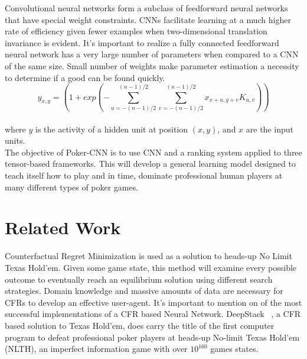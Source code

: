 \documentclass[review]{elsarticle}
\begin{document}
Convolutional neural networks form a subclass of feedforward 
neural networks that have special weight constraints. CNNs facilitate 
learning  at a much higher rate of efficiency given fewer examples when 
two-dimensional translation invariance is evident. 
It's important to realize a fully connected feedforward neural network 
has a very large number of parameters when compared to a CNN of the same size. 
Small number of weights make parameter estimation a necessity to determine 
if a good can be found quickly. ~\cite{ISutskeve2008} \\


\begin{equation*}
y_{x,y} = \left(1 + exp \left(  -\sum_{u=-(n-1)/2}^{(n-1)/2}
            \sum_{v=-(n-1)/2}^{(n-1)/2} x_{x+u,y+v} K_{u,v} \right) \right)
\end{equation*}\\

where $y$ is the activity of a hidden unit at position $(x,y)$, and $x$ 
are the input units.~\cite{ISutskeve2008} \\

The objective of Poker-CNN is to use CNN and a ranking system applied to three 
tensor-based frameworks. This will develop a general learning model designed to 
teach itself how to play and in time, dominate professional human players at 
many different types of poker games. \\


\section{Related Work}
Counterfactual Regret Minimization is used as a solution to heads-up
No Limit Texas Hold'em. Given some game state, 
this method will examine every possible outcome to eventually reach 
an equilibrium solution using different search strategies. Domain 
knowledge and massive amounts of data are necessary for CFRs to develop 
an effective user-agent. It's important to mention on of the most 
successful implementations of a CFR based Neural Network. 
DeepStack ~\cite{Moravcik2017}, a CFR based solution to Texas 
Hold'em, does carry the title of the first 
computer program to defeat professional poker players at heads-up 
No-limit Texas Hold'em (NLTH), an imperfect information 
game with over $10^{160}$ games states. ~\cite{MJohanson2013} \\
\end{document}
